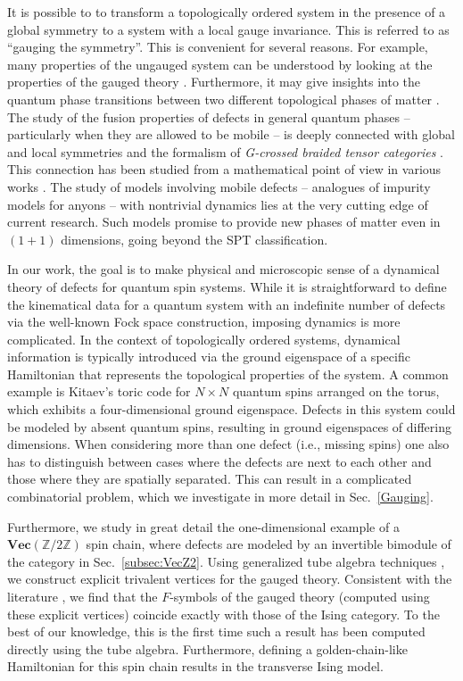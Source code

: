 \documentclass[aps,prx,twocolumn,superscriptaddress,noshowkeys]{revtex4-2}  %
\renewcommand{\Vec}{\textbf{Vec}}
\newcommand{\Z}{\mathbb{Z}}
\theoremstyle{plain}%
\theoremstyle{definition}
\theoremstyle{remark}
\begin{document}
It is possible to to transform a topologically ordered system in the presence of a global symmetry to a system with a local gauge invariance. This is referred to as ``gauging the symmetry''. This is convenient for several reasons. For example, many properties of the ungauged system can be understood by looking at the properties of the gauged theory \cite{LG12,HW12,Swingle2014,CG14}. Furthermore, it may give insights into the quantum phase transitions between two different topological phases of matter \cite{BS09,BW10,BW11,BSS12}. 
The study of the fusion properties of defects in general quantum phases -- particularly when they are allowed to be mobile -- is deeply connected with global and local symmetries and the formalism of \emph{G-crossed braided tensor categories} \cite{BBCW14}. This connection has been studied from a mathematical point of view in various works \cite{T00,ENO10,Turaev2010,CGPW16,EMJP18,CSZW18,D19,BJ19}. The study of models involving mobile defects -- analogues of impurity models for anyons -- with nontrivial dynamics lies at the very cutting edge of current research. Such models promise to provide new phases of matter even in $(1+1)$ dimensions, going beyond the SPT classification.

In our work, the goal is to make physical and microscopic sense of a dynamical theory of defects for quantum spin systems. While it is straightforward to define the kinematical data for a quantum system with an indefinite number of defects via the well-known Fock space construction, imposing dynamics is more complicated. In the context of topologically ordered systems, dynamical information is typically introduced via the ground eigenspace of a specific Hamiltonian that represents the topological properties of the system. A common example is Kitaev's toric code for $N\times N$ quantum spins arranged on the torus, which exhibits a four-dimensional ground eigenspace. Defects in this system could be modeled by absent quantum spins, resulting in ground eigenspaces of differing dimensions. When considering more than one defect (i.e., missing spins) one also has to distinguish between cases where the defects are next to each other and those where they are spatially separated. This can result in a  complicated combinatorial problem, which we investigate in more detail in Sec.~\ref{Gauging}.

Furthermore, we study in great detail the one-dimensional example of a $\Vec(\Z/2\Z)$ spin chain, where defects are modeled by an invertible bimodule of the category in Sec.~\ref{subsec:VecZ2}.
Using generalized tube algebra techniques \cite{ocneanu}, we construct explicit trivalent vertices for the gauged theory. Consistent with the literature \cite{TY,ENO10,Bombin2010,BBCW14,WBV17}, we find that the $F$-symbols of the gauged theory (computed using these explicit vertices) coincide exactly with those of the Ising category. To the best of our knowledge, this is the first time such a result has been computed directly using the tube algebra. Furthermore, defining a golden-chain-like Hamiltonian \cite{Feiguin2007} for this spin chain results in the transverse Ising model.
\end{document}

